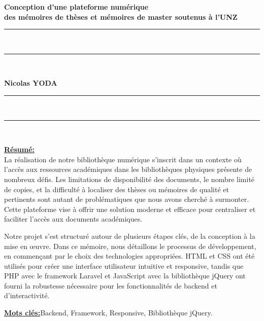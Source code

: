 \newpage
\thispagestyle{empty}
\begin{center}
  \renewcommand*{\familydefault}{\defaultFont}
  \fontsize{12pt}{12pt}\selectfont%
  \textbf{
  Conception d'une plateforme numérique\\des mémoires de thèses et mémoires de master soutenus à l'UNZ\\%
  }
\vspace{15pt} {%
  \begin{spacing}{0.05}
    \rule{200pt}{2pt}\\
    \rule{200pt}{0.75pt}\\
  \end{spacing}
  \renewcommand*{\familydefault}{\defaultFont}
  \fontsize{14pt}{14pt}\selectfont%
  \vspace{15pt}
  \textbf{Nicolas YODA}
  \vspace{8pt}
  \begin{spacing}{0.05}
    \rule{200pt}{0.75pt}\\
    \rule{200pt}{2pt}\\
  \end{spacing}
}
\end{center}

\fontsize{12pt}{12pt}\selectfont%
\underline{\textbf{Résumé:}}\\
La réalisation de notre bibliothèque numérique s'inscrit dans un contexte où l'accès aux ressources académiques dans les bibliothèques physiques présente de nombreux défis. Les limitations de disponibilité des documents, le nombre limité de copies, et la difficulté à localiser des thèses ou mémoires de qualité et pertinents sont autant de problématiques que nous avons cherché à surmonter. Cette plateforme vise à offrir une solution moderne et efficace pour centraliser et faciliter l'accès aux documents académiques.

Notre projet s'est structuré autour de plusieurs étapes clés, de la conception à la mise en œuvre. Dans ce mémoire, nous détaillons le processus de développement, en commençant par le choix des technologies appropriées. HTML et CSS ont été utilisés pour créer une interface utilisateur intuitive et responsive, tandis que PHP avec le framework Laravel et JavaScript avec la bibliothèque jQuery ont fourni la robustesse nécessaire pour les fonctionnalités de backend et d'interactivité.

\begin{spacing}{1}
\underline{\textbf{Mots clés:}}Backend, Framework, Responsive, Bibliothèque jQuery.\\
\end{spacing}


